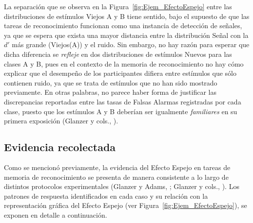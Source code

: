 La separación que se observa en la Figura~\ref{fig:Ejem_EfectoEspejo} entre las distribuciones de estímulos Viejos A y B tiene sentido, bajo el supuesto de que las tareas de reconocimiento funcionan como una instancia de detección de señales, ya que se espera que exista una mayor distancia entre la distribución Señal con la $d'$ más grande (Viejos(A)) y el ruido. Sin embargo, no hay razón para esperar que dicha diferencia se \textit{refleje} en dos distribuciones de estímulos Nuevos para las clases A y B, pues en el contexto de la memoria de reconocimiento no hay cómo explicar que el desempeño de los participantes difiera entre estímulos que sólo contienen ruido, ya que se trata de estímulos que no han sido mostrado previamente. En otras palabras, no parece haber forma de justificar las discrepancias reportadas entre las tasas de Falsas Alarmas registradas por cada clase, puesto que los estímulos A y B deberían ser igualmente \textit{familiares} en su primera exposición (Glanzer y cols., \citeyear{Glanzer1993}).\\

\subsection{Evidencia recolectada}

Como se mencionó previamente, la evidencia del Efecto Espejo en tareas de memoria de reconocimiento se presenta de manera consistente a lo largo de distintos protocolos experimentales (Glanzer y Adams, \citeyear{Glanzer1990}; Glanzer y cols., \citeyear{Glanzer1993}). Los patrones de respuesta identificados en cada caso y su relación con la representación gráfica del Efecto Espejo (ver Figura~\ref{fig:Ejem_EfectoEspejo}), se exponen en detalle a continuación.\\

